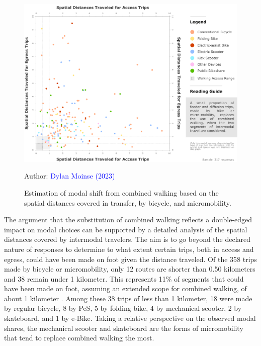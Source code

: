 \begin{refsegment}
\begin{figure}[h!]\vspace*{4pt}
    \caption{Estimation of modal shift from combined walking based on the spatial distances covered in transfer, by bicycle, and micromobility.}
    \label{fig-chap4:distances-substitution-modale}
    \centerline{\includegraphics[width=1\columnwidth]{src/Figures/Chap-4/EN_Distances_substitution_modale.pdf}}
    \vspace{5pt}
    \begin{flushright}\scriptsize{
    Author: \textcolor{blue}{Dylan Moinse (2023)}
    }\end{flushright}
\end{figure}

The argument that the substitution of combined walking reflects a double-edged impact on modal choices can be supported by a detailed analysis of the spatial distances covered by intermodal travelers. The aim is to go beyond the declared nature of responses to determine to what extent certain trips, both in access and egress, could have been made on foot given the distance traveled. Of the 358 trips made by bicycle or micromobility, only 12 routes are shorter than 0.50 kilometers and 38 remain under 1 kilometer. This represents 11\% of segments that could have been made on foot, assuming an extended scope for combined walking, of about 1 kilometer \textcolor{blue}{\autocite[34]{canepa_bursting_2007}}. Among these 38 trips of less than 1 kilometer, 18 were made by regular bicycle, 8 by \acrshort{PeS}, 5 by folding bike, 4 by mechanical scooter, 2 by skateboard, and 1 by \acrshort{e-Bike}. Taking a relative perspective on the observed modal shares, the mechanical scooter and skateboard are the forms of micromobility that tend to replace combined walking the most.%


\end{refsegment}
